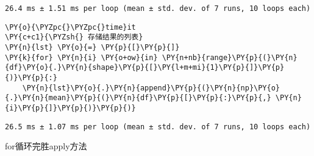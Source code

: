     \begin{Verbatim}[commandchars=\\\{\}]
26.4 ms ± 1.51 ms per loop (mean ± std. dev. of 7 runs, 10 loops each)
    \end{Verbatim}

    \begin{tcolorbox}[breakable, size=fbox, boxrule=1pt, pad at break*=1mm,colback=cellbackground, colframe=cellborder]
\begin{Verbatim}[commandchars=\\\{\}]
\PY{o}{\PYZpc{}\PYZpc{}time}it
\PY{c+c1}{\PYZsh{} 存储结果的列表}
\PY{n}{lst} \PY{o}{=} \PY{p}{[}\PY{p}{]}
\PY{k}{for} \PY{n}{i} \PY{o+ow}{in} \PY{n+nb}{range}\PY{p}{(}\PY{n}{df}\PY{o}{.}\PY{n}{shape}\PY{p}{[}\PY{l+m+mi}{1}\PY{p}{]}\PY{p}{)}\PY{p}{:}
    \PY{n}{lst}\PY{o}{.}\PY{n}{append}\PY{p}{(}\PY{n}{np}\PY{o}{.}\PY{n}{mean}\PY{p}{(}\PY{n}{df}\PY{p}{[}\PY{p}{:}\PY{p}{,} \PY{n}{i}\PY{p}{]}\PY{p}{)}\PY{p}{)}
\end{Verbatim}
\end{tcolorbox}

    \begin{Verbatim}[commandchars=\\\{\}]
26.5 ms ± 1.07 ms per loop (mean ± std. dev. of 7 runs, 10 loops each)
    \end{Verbatim}

    for循环完胜apply方法
